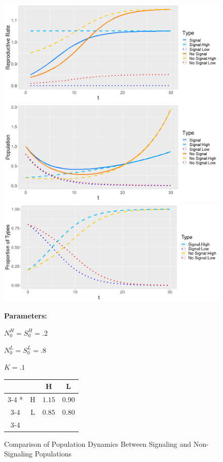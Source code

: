 \begin{figure}[p]
  \caption{Comparison of Population Dynamics Between Signaling and Non-Signaling Populations}
   \label{fig:Apart}
    \includegraphics[width=\textwidth, height=.28\textheight]{Images/Rate_Apart.png}
    \includegraphics[width=\textwidth, height=.28\textheight]{Images/Pop_Apart.png}
    \includegraphics[width=\textwidth, height=.28\textheight]{Images/Prop_Apart.png}
 \begin{minipage}[c]{.2\textwidth}
    \textbf{Parameters:}
    \end{minipage}\hfill
    \begin{minipage}[c]{.2\textwidth}
    
    $N_0^H = S_0^H = .2$
    
    $N_0^L = S_0^L = .8$
    
    $K = .1$
    \end{minipage}\hfill
  \begin{minipage}[c]{.6\textwidth}
  \begin{tabular}{cc|c|c|}
      & \multicolumn{1}{c}{} & \multicolumn{1}{c}{H}  & \multicolumn{1}{c}{L} \\\cline{3-4}
      \multirow{2}*{}  & H & $1.15$ & $0.90$ \\\cline{3-4}
      & L & $0.85$ & $0.80$ \\\cline{3-4}
    \end{tabular}
    \end{minipage}
    \end{figure}


